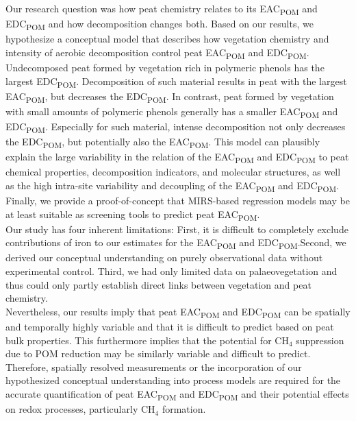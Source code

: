 \documentclass[draft,linenumbers]{agujournal2018}
\begin{document}
Our research question was how peat chemistry relates to its
EAC\textsubscript{POM} and EDC\textsubscript{POM} and how decomposition
changes both. Based on our results, we hypothesize a conceptual model
that describes how vegetation chemistry and intensity of aerobic
decomposition control peat EAC\textsubscript{POM} and
EDC\textsubscript{POM}. Undecomposed peat formed by vegetation rich in
polymeric phenols has the largest EDC\textsubscript{POM}. Decomposition
of such material results in peat with the largest
EAC\textsubscript{POM}, but decreases the EDC\textsubscript{POM}. In
contrast, peat formed by vegetation with small amounts of polymeric
phenols generally has a smaller EAC\textsubscript{POM} and
EDC\textsubscript{POM}. Especially for such material, intense
decomposition not only decreases the EDC\textsubscript{POM}, but
potentially also the EAC\textsubscript{POM}. This model can plausibly
explain the large variability in the relation of the
EAC\textsubscript{POM} and EDC\textsubscript{POM} to peat chemical
properties, decomposition indicators, and molecular structures, as well
as the high intra-site variability and decoupling of the
EAC\textsubscript{POM} and EDC\textsubscript{POM}. Finally, we provide a
proof-of-concept that MIRS-based regression models may be at least
suitable as screening tools to predict peat EAC\textsubscript{POM}.\\
Our study has four inherent limitations: First, it is difficult to
completely exclude contributions of iron to our estimates for the
EAC\textsubscript{POM} and EDC\textsubscript{POM}.Second, we derived our
conceptual understanding on purely observational data without
experimental control. Third, we had only limited data on
palaeovegetation and thus could only partly establish direct links
between vegetation and peat chemistry.\\
Nevertheless, our results imply that peat EAC\textsubscript{POM} and
EDC\textsubscript{POM} can be spatially and temporally highly variable
and that it is difficult to predict based on peat bulk properties. This
furthermore implies that the potential for CH\(_4\) suppression due to
POM reduction may be similarly variable and difficult to predict.\\
Therefore, spatially resolved measurements or the incorporation of our
hypothesized conceptual understanding into process models are required
for the accurate quantification of peat EAC\textsubscript{POM} and
EDC\textsubscript{POM} and their potential effects on redox processes,
particularly CH\(_4\) formation.
\end{document}
